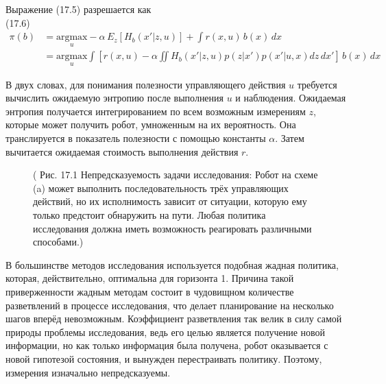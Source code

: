 \documentclass[10pt,a4paper]{article}
\begin{document}
Выражение (17.5) разрешается как\\

(17.6)
\begin{equation*}
\begin{split}
\pi(b)&=\underset{u}{\text{argmax}}-\alpha\,E_z[H_b(x'|z,u)]+\int r(x,u)\,b(x)\,dx\\
&=\underset{u}{\text{argmax}}\int[r(x,u)-\alpha\iint H_b(x'|z,u)p(z|x')p(x'|u,x)dz\,dx']\,b(x)\,dx
\end{split}
\end{equation*}

В двух словах, для понимания полезности управляющего действия $u$ требуется вычислить ожидаемую энтропию после выполнения $u$ и наблюдения. Ожидаемая энтропия получается интегрированием по всем возможным измерениям $z$, которые может получить робот, умноженным на их вероятность.  Она транслируется в показатель полезности с помощью константы $\alpha$. Затем вычитается ожидаемая стоимость выполнения действия $r$.

\begin{figure}[H]
	\caption{ ( Рис. 17.1 Непредсказуемость задачи исследования: Робот на схеме (a) может выполнить последовательность трёх управляющих действий, но их исполнимость зависит от ситуации, которую ему только предстоит обнаружить на пути. Любая политика исследования должна иметь возможность реагировать различными способами.) }
	\label{fig:171orig}
\end{figure}

В большинстве методов исследования используется подобная жадная политика, которая, действительно, оптимальна для горизонта 1. Причина такой приверженности жадным методам состоит в чудовищном количестве разветвлений в процессе исследования, что делает планирование на несколько шагов вперёд невозможным. Коэффициент разветвления так велик в силу самой природы проблемы исследования, ведь его целью является получение новой информации, но как только информация была получена, робот оказывается с новой гипотезой состояния, и вынужден перестраивать политику. Поэтому, измерения изначально непредсказуемы.
\end{document}
